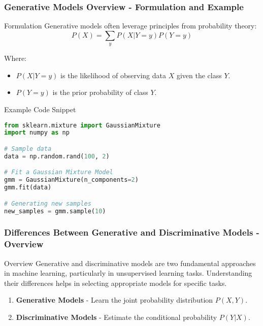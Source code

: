 \documentclass[aspectratio=169]{beamer}
\begin{document}
\begin{frame}[fragile]
    \frametitle{Generative Models Overview - Formulation and Example}
    
    \begin{block}{Formulation}
        Generative models often leverage principles from probability theory:
        \begin{equation}
            P(X) = \sum_{y} P(X|Y=y) P(Y=y)
        \end{equation}
        
        Where:
        \begin{itemize}
            \item \( P(X|Y=y) \) is the likelihood of observing data \( X \) given the class \( Y \).
            \item \( P(Y=y) \) is the prior probability of class \( Y \).
        \end{itemize}
    \end{block}
    
    \begin{block}{Example Code Snippet}
        \begin{lstlisting}[language=Python]
from sklearn.mixture import GaussianMixture
import numpy as np

# Sample data
data = np.random.rand(100, 2)

# Fit a Gaussian Mixture Model
gmm = GaussianMixture(n_components=2)
gmm.fit(data)

# Generating new samples
new_samples = gmm.sample(10)
        \end{lstlisting}
    \end{block}
\end{frame}

\begin{frame}[fragile]
  \frametitle{Differences Between Generative and Discriminative Models - Overview}
  
  \begin{block}{Overview}
    Generative and discriminative models are two fundamental approaches in machine learning, particularly in unsupervised learning tasks. Understanding their differences helps in selecting appropriate models for specific tasks.
  \end{block}

  \begin{enumerate}
    \item \textbf{Generative Models} - Learn the joint probability distribution \( P(X, Y) \).
    \item \textbf{Discriminative Models} - Estimate the conditional probability \( P(Y | X) \).
  \end{enumerate}
\end{frame}
\end{document}
